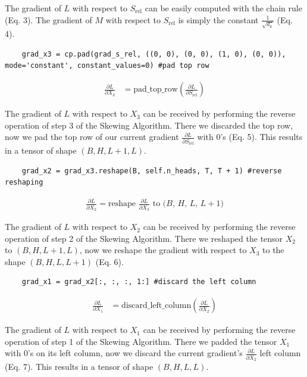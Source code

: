\documentclass[a4paper,12pt]{extarticle}
\begin{document}
\raggedright The gradient of $L$ with respect to $S_\text{rel}$ can be easily computed with the chain rule (Eq. 3). The gradient of $M$ with respect to $S_\text{rel}$ is simply the constant $\frac{1}{\sqrt{d_k}}$ (Eq. 4). \newline
\vspace{0.1cm}
\begin{lstlisting}
    grad_x3 = cp.pad(grad_s_rel, ((0, 0), (0, 0), (1, 0), (0, 0)), mode='constant', constant_values=0) #pad top row
\end{lstlisting}
\begin{align}
\frac{\partial L}{\partial X_3}&=\text{pad\_top\_row}\left(\frac{\partial L}{\partial S_\text{rel}}\right)
\end{align}

The gradient of $L$ with respect to $X_3$ can be received by performing the reverse operation of step 3 of the Skewing Algorithm. There we discarded the top row, now we pad the top row of our current gradient $\frac{\partial L}{\partial S_\text{rel}}$ with 0's (Eq. 5). This results in a tensor of shape $(B, H, L + 1, L)$. \newline
\vspace{0.1cm}

\begin{lstlisting}
    grad_x2 = grad_x3.reshape(B, self.n_heads, T, T + 1) #reverse reshaping
\end{lstlisting}
\begin{align}
\frac{\partial L}{\partial X_2}=\text{reshape } \frac{\partial L}{\partial X_3} \text{ to ($B$, $H$, $L$, $L + 1$)}
\end{align}

The gradient of $L$ with respect to $X_2$ can be received by performing the reverse operation of step 2 of the Skewing Algorithm. There we reshaped the tensor $X_2$ to $(B, H, L + 1, L)$, now we reshape the gradient with respect to $X_3$ to the shape $(B, H, L, L + 1)$ (Eq. 6).\newline
\vspace{0.1 cm}

\begin{lstlisting}
    grad_x1 = grad_x2[:, :, :, 1:] #discard the left column
\end{lstlisting}
\begin{align}
\frac{\partial L}{\partial X_1}&=\text{discard\_left\_column}\left(\frac{\partial L}{\partial X_2}\right)
\end{align}

The gradient of $L$ with respect to $X_1$ can be received by performing the reverse operation of step 1 of the Skewing Algorithm. There we padded the tensor $X_1$ with 0's on its left column, now we discard the current gradient's $\frac{\partial L}{\partial X_2}$ left column (Eq. 7). This results in a tensor of shape $(B, H, L, L)$.\newline
\vspace{0.1 cm}
\end{document}

